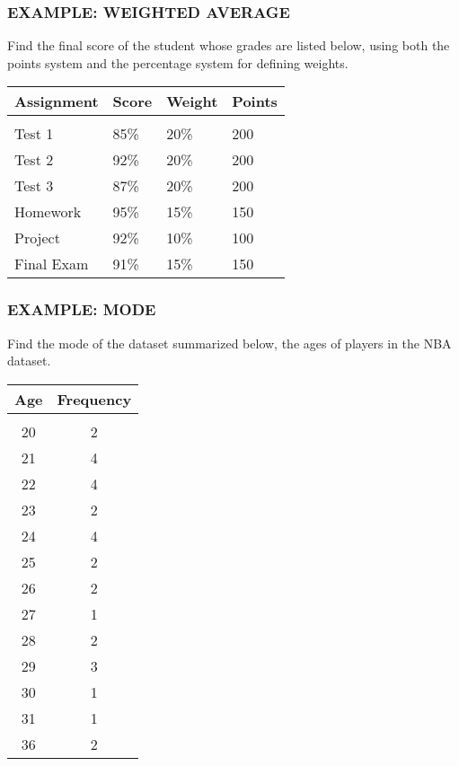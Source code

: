 \documentclass[8pt]{beamer}
\newcommand{\extitle}[1]{\frametitle{\fontfamily{fvs}\selectfont \small\color{black!70!blue!80!cyan}\uppercase{\bfseries Example: #1}}}
\newenvironment{exsol}
{
\begin{tcolorbox}[colframe=black!50!blue!50!cyan,
colback=white,
bottomrule=0mm,
rightrule=0mm,
sharp corners=all] 

}
{ \end{tcolorbox}}
\begin{document}
\begin{frame}
\extitle{Weighted Average}
Find the final score of the student whose grades are listed below, using both the points system and the percentage system for defining weights.
\begin{center}
\begin{tabular}{l l l l}
\textbf{Assignment} & \textbf{Score} & \textbf{Weight} & \textbf{Points}\\
\hline
& \\
Test 1 & 85\% & 20\% & 200\\
Test 2 & 92\% & 20\% & 200\\
Test 3 & 87\% & 20\% & 200\\
Homework & 95\% & 15\% & 150\\
Project & 92\% & 10\% & 100\\
Final Exam & 91\% & 15\% & 150
\end{tabular}
\end{center}

\begin{exsol}
\vspace{3in}
\text{}
\end{exsol}
\end{frame}

\begin{frame}
\extitle{Mode}
Find the mode of the dataset summarized below, the ages of players in the NBA dataset.
\begin{center}
\begin{tabular}{c c}
\textbf{Age} & \textbf{Frequency}\\
\hline
& \\
20 & 2\\
21 & 4\\
22 & 4\\
23 & 2\\
24 & 4\\
25 & 2\\
26 & 2\\
27 & 1\\
28 & 2\\
29 & 3\\
30 & 1\\
31 & 1\\
36 & 2
\end{tabular}
\end{center}

\begin{exsol}
\vspace{3in}
\text{}
\end{exsol}
\end{frame}
\end{document}
